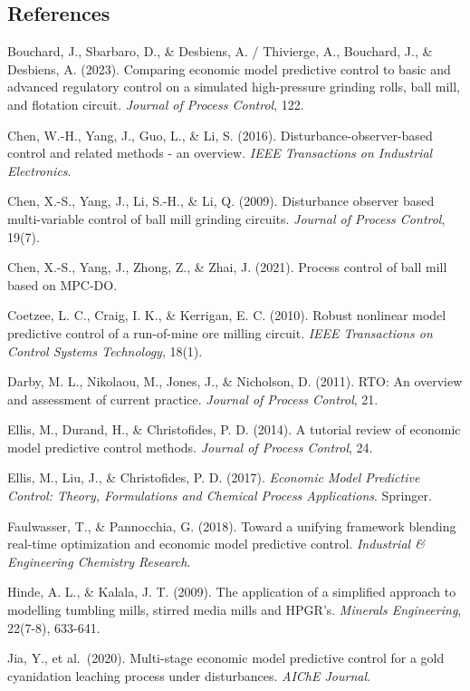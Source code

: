\documentclass[
  14pt,
]{extarticle}
\begin{document}
\newpage

\subsection{References}\label{references}

Bouchard, J., Sbarbaro, D., \& Desbiens, A. / Thivierge, A., Bouchard,
J., \& Desbiens, A. (2023). Comparing economic model predictive control
to basic and advanced regulatory control on a simulated high-pressure
grinding rolls, ball mill, and flotation circuit. \emph{Journal of
Process Control}, 122.

Chen, W.-H., Yang, J., Guo, L., \& Li, S. (2016).
Disturbance-observer-based control and related methods - an overview.
\emph{IEEE Transactions on Industrial Electronics}.

Chen, X.-S., Yang, J., Li, S.-H., \& Li, Q. (2009). Disturbance observer
based multi-variable control of ball mill grinding circuits.
\emph{Journal of Process Control}, 19(7).

Chen, X.-S., Yang, J., Zhong, Z., \& Zhai, J. (2021). Process control of
ball mill based on MPC-DO.

Coetzee, L. C., Craig, I. K., \& Kerrigan, E. C. (2010). Robust
nonlinear model predictive control of a run-of-mine ore milling circuit.
\emph{IEEE Transactions on Control Systems Technology}, 18(1).

Darby, M. L., Nikolaou, M., Jones, J., \& Nicholson, D. (2011). RTO: An
overview and assessment of current practice. \emph{Journal of Process
Control}, 21.

Ellis, M., Durand, H., \& Christofides, P. D. (2014). A tutorial review
of economic model predictive control methods. \emph{Journal of Process
Control}, 24.

Ellis, M., Liu, J., \& Christofides, P. D. (2017). \emph{Economic Model
Predictive Control: Theory, Formulations and Chemical Process
Applications}. Springer.

Faulwasser, T., \& Pannocchia, G. (2018). Toward a unifying framework
blending real-time optimization and economic model predictive control.
\emph{Industrial \& Engineering Chemistry Research}.

Hinde, A. L., \& Kalala, J. T. (2009). The application of a simplified
approach to modelling tumbling mills, stirred media mills and HPGR's.
\emph{Minerals Engineering}, 22(7-8), 633-641.

Jia, Y., et al.~(2020). Multi-stage economic model predictive control
for a gold cyanidation leaching process under disturbances. \emph{AIChE
Journal}.
\end{document}
